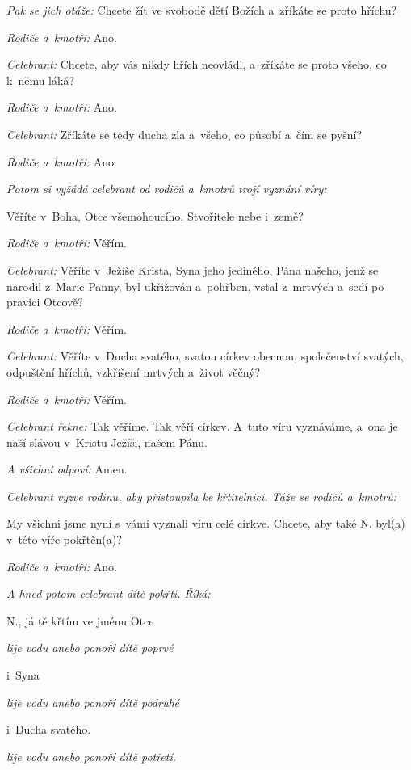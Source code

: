 \textit{Pak se jich otáže:} Chcete žít ve svobodě dětí Božích a~zříkáte se proto hříchu?

\textit{Rodiče a~kmotři:} Ano.

\textit{Celebrant:} Chcete, aby vás nikdy hřích neovládl,
a~zříkáte se proto všeho, co k~němu láká?

\textit{Rodiče a~kmotři:} Ano.

\textit{Celebrant:} Zříkáte se tedy ducha zla a~všeho, co působí a~čím se pyšní?

\textit{Rodiče a~kmotři:} Ano.

\textit{Potom si vyžádá celebrant od rodičů a~kmotrů trojí vyznání víry:}

Věříte v~Boha, Otce všemohoucího, Stvořitele nebe i~země?

\textit{Rodiče a~kmotři:} Věřím.

\textit{Celebrant:} Věříte v~Ježíše Krista, Syna jeho jediného, Pána našeho,
jenž se narodil z~Marie Panny, byl ukřižován a~pohřben, vstal z~mrtvých a~sedí po pravici Otcově?

\textit{Rodiče a~kmotři:} Věřím.

\textit{Celebrant:} Věříte v~Ducha svatého, svatou církev obecnou, společenství svatých,
odpuštění hříchů, vzkříšení mrtvých a~život věčný?

\textit{Rodiče a~kmotři:} Věřím.

\textit{Celebrant řekne:} Tak věříme. Tak věří církev. A~tuto víru vyznáváme,
a~ona je naší slávou v~Kristu Ježíši, našem Pánu.

\textit{A všichni odpoví:} Amen.

\pars{}

\textit{Celebrant vyzve rodinu, aby přistoupila ke křtitelnici. Táže se rodičů a~kmotrů:}

My všichni jsme nyní s~vámi vyznali víru celé církve. Chcete,
aby také {\color{red}N.} byl(a) v~této víře pokřtěn(a)?

\textit{Rodiče a~kmotři:} Ano.

\textit{A hned potom celebrant dítě pokřtí. Říká:}

{\color{red}N.}, já tě křtím ve jménu Otce

\textit{lije vodu anebo ponoří dítě poprvé}

i~Syna

\textit{lije vodu anebo ponoří dítě podruhé}

i~Ducha svatého.

\textit{lije vodu anebo ponoří dítě potřetí.}

